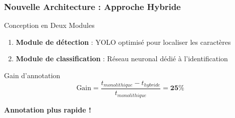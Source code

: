 \documentclass[
	11pt,
	aspectratio=169,
]{beamer}
\begin{document}
\begin{frame}
	\frametitle{Nouvelle Architecture : Approche Hybride}
	
	\begin{block}{Conception en Deux Modules}
		\begin{enumerate}
			\item \textbf{Module de détection} : YOLO optimisé pour localiser les caractères
			\item \textbf{Module de classification} : Réseau neuronal dédié à l'identification
		\end{enumerate}
	\end{block}
	
	\bigskip
	
	\begin{exampleblock}{Gain d'annotation}
		\begin{equation*}
			\text{Gain} = \frac{t_{monolithique} - t_{hybride}}{t_{monolithique}} = \mathbf{25\%}
		\end{equation*}
	\end{exampleblock}
	
	\bigskip
	
	\textbf{Annotation plus rapide !}
\end{frame}

\end{document}
